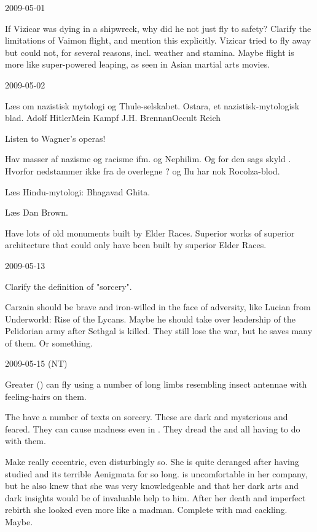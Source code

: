 2009-05-01

If Vizicar was dying in a shipwreck, why did he not just fly to safety? 
Clarify the limitations of Vaimon flight, and mention this explicitly.
Vizicar tried to fly away but could not, for several reasons, incl. weather and stamina.
Maybe flight is more like super-powered leaping, as seen in Asian martial arts movies.



2009-05-02

Læs om nazistisk mytologi og Thule-selskabet.
Ostara, et nazistisk-mytologisk blad.
Adolf Hitler\dash{}Mein Kampf
J.H. Brennan\dash{}Occult Reich

Listen to Wagner's operas!

Hav masser af nazisme og racisme ifm. \Aryothim og Nephilim.
Og for den sags skyld \resphain.
Hvorfor nedstammer \resphain ikke fra de overlegne \Aryothim?
\Semiza og Ilu har nok Rocolza-blod.

Læs Hindu-mytologi: Bhagavad Ghita.

Læs Dan Brown.

Have lots of old monuments built by Elder Races. Superior works of superior architecture that could only have been built by superior Elder Races.



2009-05-13

Clarify the definition of "sorcery".

Carzain should be brave and iron-willed in the face of adversity, like Lucian from Underworld: Rise of the Lycans. 
Maybe he should take over leadership of the Pelidorian army after Sethgal is killed. 
They still lose the war, but he saves many of them. 
Or something.



2009-05-15 (NT)

Greater \banes (\baneknights) can fly using a number of long limbs resembling insect antennae with feeling-hairs on them.

The \resphain have a number of texts on \bane sorcery.
These are dark and mysterious and feared.
They can cause madness even in \resphain.
They dread the \banes and all having to do with them.

Make \Urizeth really eccentric, even disturbingly so.
She is quite deranged after having studied \WanderersInDarknessEmph and its terrible Aenigmata for so long.
\Teshrial is uncomfortable in her company, but he also knew that she was very knowledgeable and that her dark arts and dark insights would be of invaluable help to him.
After her death and imperfect rebirth she looked even more like a madman. 
Complete with mad cackling.
Maybe.

